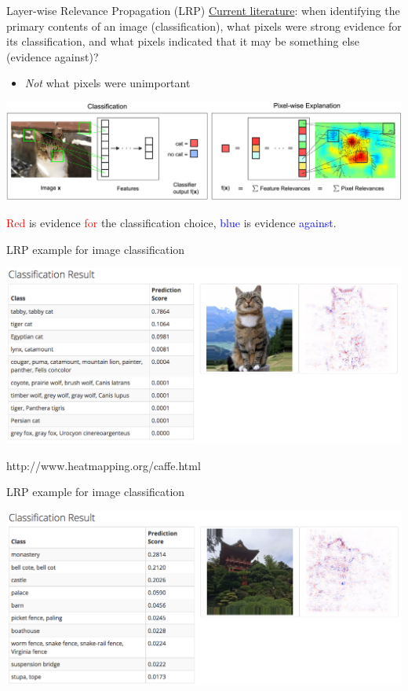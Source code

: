 \documentclass[compress]{beamer}
\begin{document}
\begin{frame}{Layer-wise Relevance Propagation (LRP)}
  \underline{Current literature}: when identifying the primary contents of an image (classification), what pixels were strong evidence for its classification, and what pixels indicated that it may be something else (evidence against)?
  \begin{itemize}
  \item \emph{Not} what pixels were unimportant
  \end{itemize}
  \begin{center}
    \includegraphics[width=1.00\textwidth]{./figures/2-Figure1-1.png}
  \end{center}
  \textcolor{red}{Red} is evidence \textcolor{red}{for} the classification choice, \textcolor{blue}{blue} is evidence \textcolor{blue}{against}.
\end{frame}

\begin{frame}{LRP example for image classification}
  \begin{center}
    \includegraphics[width=1.00\textwidth]{./figures/lrp_example_1.png}
  \end{center}
  http://www.heatmapping.org/caffe.html
\end{frame}

\begin{frame}{LRP example for image classification}
  \begin{center}
    \includegraphics[width=1.00\textwidth]{./figures/lrp_example_2.png}
  \end{center}
\end{frame}
\end{document}
